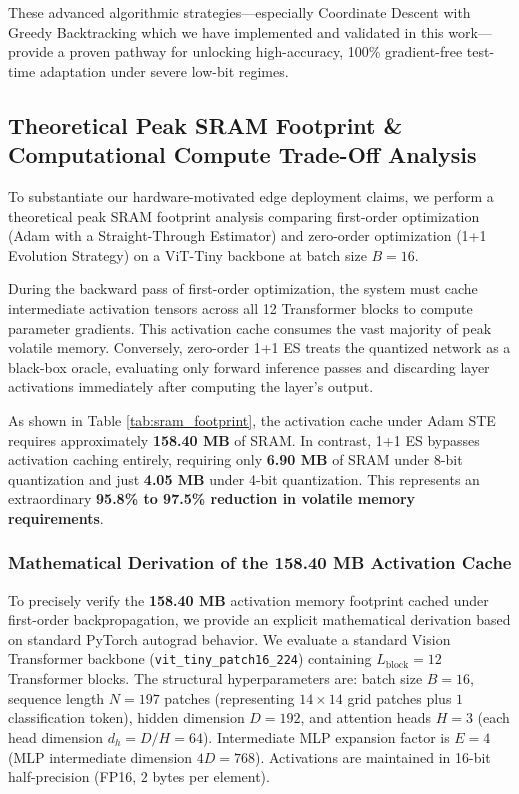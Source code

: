 These advanced algorithmic strategies—especially Coordinate Descent with Greedy Backtracking which we have implemented and validated in this work—provide a proven pathway for unlocking high-accuracy, 100\% gradient-free test-time adaptation under severe low-bit regimes.

\subsection{Theoretical Peak SRAM Footprint \& Computational Compute Trade-Off Analysis}
To substantiate our hardware-motivated edge deployment claims, we perform a theoretical peak SRAM footprint analysis comparing first-order optimization (Adam with a Straight-Through Estimator) and zero-order optimization (1+1 Evolution Strategy) on a ViT-Tiny backbone at batch size $B=16$. 

During the backward pass of first-order optimization, the system must cache intermediate activation tensors across all 12 Transformer blocks to compute parameter gradients. This activation cache consumes the vast majority of peak volatile memory. Conversely, zero-order 1+1 ES treats the quantized network as a black-box oracle, evaluating only forward inference passes and discarding layer activations immediately after computing the layer's output. 

As shown in Table \ref{tab:sram_footprint}, the activation cache under Adam STE requires approximately \textbf{158.40 MB} of SRAM. In contrast, 1+1 ES bypasses activation caching entirely, requiring only \textbf{6.90 MB} of SRAM under 8-bit quantization and just \textbf{4.05 MB} under 4-bit quantization. This represents an extraordinary \textbf{95.8\% to 97.5\% reduction in volatile memory requirements}.

\subsubsection{Mathematical Derivation of the 158.40 MB Activation Cache}
To precisely verify the \textbf{158.40 MB} activation memory footprint cached under first-order backpropagation, we provide an explicit mathematical derivation based on standard PyTorch autograd behavior. 
We evaluate a standard Vision Transformer backbone (\texttt{vit\_tiny\_patch16\_224}) containing $L_{\text{block}} = 12$ Transformer blocks. The structural hyperparameters are: batch size $B=16$, sequence length $N=197$ patches (representing $14 \times 14$ grid patches plus $1$ classification token), hidden dimension $D=192$, and attention heads $H=3$ (each head dimension $d_h = D/H = 64$). Intermediate MLP expansion factor is $E=4$ (MLP intermediate dimension $4D = 768$). Activations are maintained in 16-bit half-precision (FP16, $2$ bytes per element).

